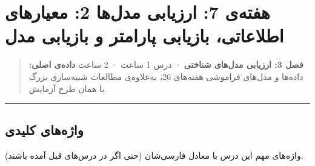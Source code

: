 \section{هفته‌ی 7: ارزیابی مدل‌ها 2: معیارهای اطلاعاتی، بازیابی پارامتر و
بازیابی مدل}

\begin{quote}
\textbf{فصل 3: ارزیابی مدل‌های شناختی} · درس 1 ساعت ·  2 ساعت
\textbf{داده‌ی اصلی:} داده‌ها و مدل‌های فراموشی هفته‌های 2\lr{--}6، به‌علاوه‌ی
مطالعات شبیه‌سازی بزرگ با همان طرح آزمایش.
\end{quote}

\begin{center}\rule{0.5\linewidth}{0.5pt}\end{center}

\subsection{واژه‌های کلیدی}

واژه‌های مهم این درس با معادل فارسی‌شان (حتی اگر در درس‌های قبل آمده
باشند).

